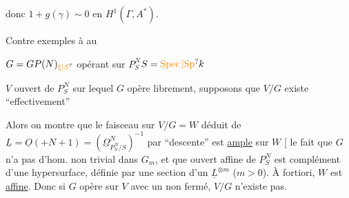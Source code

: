 donc $1+g(\gamma)\sim0$ en $H^1(\Gamma,A^*)$.
\begin{flushright}
Contre exemples à  au 
\end{flushright}
$G=GP(N)_{\unsure{\xi|S}}$ opérant sur $P^N_S$\qquad $S=\unsure{\operatorname{Spec}|\mathrm{Sp}}k$

$V$ ouvert de $P^N_S$ sur lequel $G$ opère librement, supposons que $V/G$ existe ``effectivement''

Alors on montre que le faisceau sur $V/G=W$ déduit de $\underline{L}=\underline{O}(+N+1)=(\underline{\Omega}^N_{P^N_S/S})^{-1}$ par ``descente'' est \uline{ample} sur $W$ [ le fait que $G$ n'a pas d'hom. non trivial dans $G_m$, et que  ouvert affine de $P^N_S$ est complément d'une hypersurface,  définie par une section d'un $\underline{L}^{\otimes m}$ ($m>0$). À fortiori, $W$ est \uline{affine}. Donc si $G$ opère  sur $V$ avec un  non fermé, $V/G$ n'existe pas.

